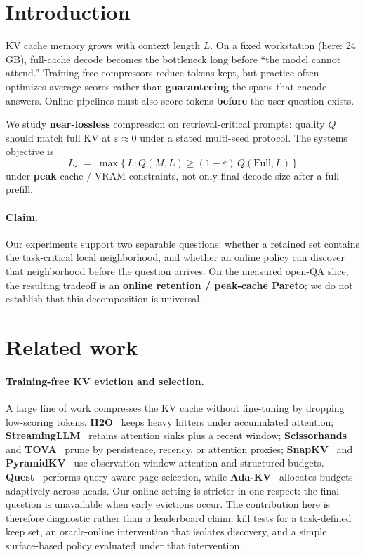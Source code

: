 \documentclass[11pt,a4paper]{article}
\begin{document}
\section{Introduction}

KV cache memory grows with context length $L$. On a fixed workstation (here: 24\,GB), full-cache decode becomes the bottleneck long before ``the model cannot attend.'' Training-free compressors reduce tokens kept, but practice often optimizes average scores rather than \textbf{guaranteeing} the spans that encode answers. Online pipelines must also score tokens \textbf{before} the user question exists.

We study \textbf{near-lossless} compression on retrieval-critical prompts: quality $Q$ should match full KV at $\varepsilon\!\approx\!0$ under a stated multi-seed protocol. The systems objective is
\begin{equation}
  L_\varepsilon \;=\; \max\bigl\{\, L : Q(M,L) \ge (1-\varepsilon)\,Q(\mathrm{Full},L) \,\bigr\}
\end{equation}
under \textbf{peak} cache / VRAM constraints, not only final decode size after a full prefill.

\paragraph{Claim.}
Our experiments support two separable questions: whether a retained set contains the task-critical local neighborhood, and whether an online policy can discover that neighborhood before the question arrives. On the measured open-QA slice, the resulting tradeoff is an \textbf{online retention / peak-cache Pareto}; we do not establish that this decomposition is universal.

\section{Related work}
\label{sec:related}

\paragraph{Training-free KV eviction and selection.}
A large line of work compresses the KV cache without fine-tuning by dropping low-scoring tokens. \textbf{H2O}~\cite{zhang2023h2o} keeps heavy hitters under accumulated attention; \textbf{StreamingLLM}~\cite{xiao2023streamingllm} retains attention sinks plus a recent window; \textbf{Scissorhands}~\cite{liu2023scissorhands} and \textbf{TOVA}~\cite{orenzain2024tova} prune by persistence, recency, or attention proxies; \textbf{SnapKV}~\cite{li2024snapkv} and \textbf{PyramidKV}~\cite{cai2024pyramidkv} use observation-window attention and structured budgets. \textbf{Quest}~\cite{tang2024quest} performs query-aware page selection, while \textbf{Ada-KV}~\cite{feng2024adakv} allocates budgets adaptively across heads. Our online setting is stricter in one respect: the final question is unavailable when early evictions occur. The contribution here is therefore diagnostic rather than a leaderboard claim: kill tests for a task-defined keep set, an oracle-online intervention that isolates discovery, and a simple surface-based policy evaluated under that intervention.
\end{document}
